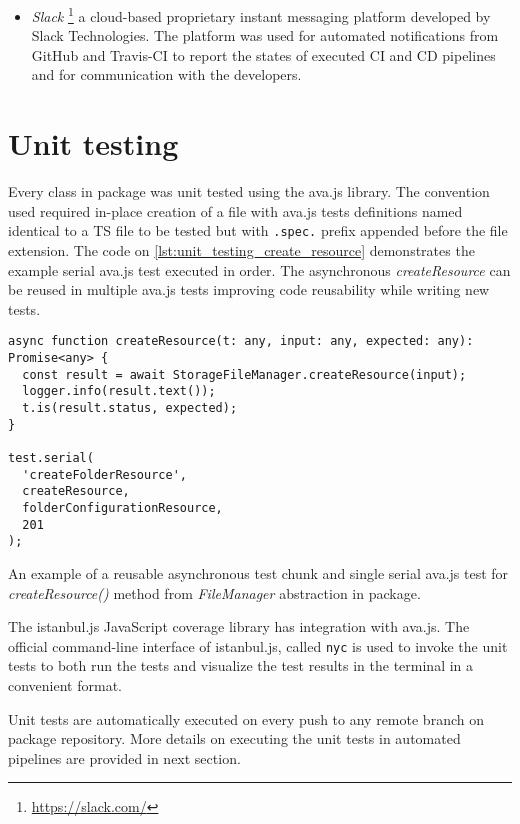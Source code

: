 \begin{itemize}
    \item \textit{Slack} \footnote{\url{https://slack.com/}} a cloud-based proprietary instant messaging platform developed by Slack Technologies. The platform was used for automated notifications from GitHub and Travis-CI to report the states of executed CI and CD pipelines and for communication with the \lpa{} developers.
\end{itemize} 

\section{Unit testing}
\label{ssec:lpas_unit_testing}

Every class in \lpas{} package was unit tested using the ava.js library. The convention used required in-place creation of a file with ava.js tests definitions named identical to a TS file to be tested but with \texttt{.spec.} prefix appended before the file extension. The code on \autoref{lst:unit_testing_create_resource} demonstrates the example serial ava.js test executed in order. The asynchronous \textit{createResource} can be reused in multiple ava.js tests improving code reusability while writing new tests.

\begin{listing}[H]    
\begin{verbatim}
async function createResource(t: any, input: any, expected: any): Promise<any> {
  const result = await StorageFileManager.createResource(input);
  logger.info(result.text());
  t.is(result.status, expected);
}

test.serial(
  'createFolderResource',
  createResource,
  folderConfigurationResource,
  201
);
\end{verbatim}
\caption{An example of a reusable asynchronous test chunk and single serial ava.js test for \textit{createResource()} method from \textit{FileManager} abstraction in \lpas{} package.} 
\label{lst:unit_testing_create_resource}
\end{listing}

The istanbul.js JavaScript coverage library has integration with ava.js. The official command-line interface of istanbul.js, called \texttt{nyc} is used to invoke the unit tests to both run the tests and visualize the test results in the terminal in a convenient format.

Unit tests are automatically executed on every push to any remote branch on \lpas{} package repository. More details on executing the unit tests in automated pipelines are provided in next section.

